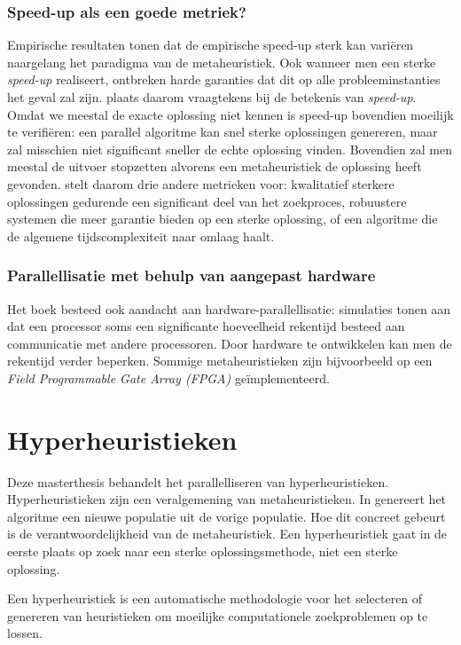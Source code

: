 \subsubsection{Speed-up als een goede metriek?}
Empirische resultaten tonen dat de empirische speed-up sterk kan vari\"eren naargelang het paradigma van de metaheuristiek. Ook wanneer men een sterke \emph{speed-up} realiseert, ontbreken harde garanties dat dit op alle probleeminstanties het geval zal zijn. \cite{crainicAndToulouse} plaats daarom vraagtekens bij de betekenis van \emph{speed-up}. Omdat we meestal de exacte oplossing niet kennen is speed-up bovendien moeilijk te verifi\"eren: een parallel algoritme kan snel sterke oplossingen genereren, maar zal misschien niet significant sneller de echte oplossing vinden. Bovendien zal men meestal de uitvoer stopzetten alvorens een metaheuristiek de oplossing heeft gevonden. \cite{crainicAndToulouse} stelt daarom drie andere metrieken voor: kwalitatief sterkere oplossingen gedurende een significant deel van het zoekproces, robuustere systemen die meer garantie bieden op een sterke oplossing, of een algoritme die de algemene tijdscomplexiteit naar omlaag haalt.

\subsubsection{Parallellisatie met behulp van aangepast hardware}
Het boek besteed ook aandacht aan hardware-parallellisatie: simulaties tonen aan dat een processor soms een significante hoeveelheid rekentijd besteed aan communicatie met andere processoren. Door hardware te ontwikkelen kan men de rekentijd verder beperken. Sommige metaheuristieken zijn bijvoorbeeld op een \emph{Field Programmable Gate Array (FPGA)} ge\"implementeerd\cite{conf/fpt/GuntschMSDESS02,journals/gpem/Martin01}.

\section{Hyperheuristieken}

Deze masterthesis behandelt het parallelliseren van hyperheuristieken. Hyperheuristieken zijn een veralgemening van metaheuristieken. In  genereert het algoritme een nieuwe populatie uit de vorige populatie. Hoe dit concreet gebeurt is de verantwoordelijkheid van de metaheuristiek. Een hyperheuristiek gaat in de eerste plaats op zoek naar een sterke oplossingsmethode, niet een sterke oplossing\cite{Burke_aclassification}.
\begin{definition}
Een hyperheuristiek is een automatische methodologie voor het selecteren of genereren van heuristieken om moeilijke computationele zoekproblemen op te lossen.
\end{definition}

